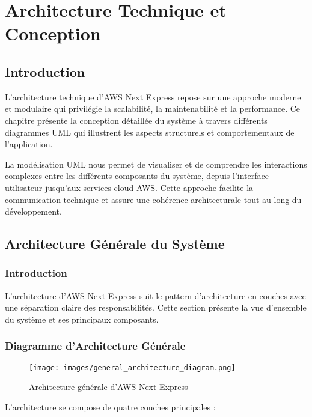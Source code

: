 \chapter{Architecture Technique et Conception}

\section{Introduction}

L'architecture technique d'AWS Next Express repose sur une approche moderne et modulaire qui privilégie la scalabilité, la maintenabilité et la performance. Ce chapitre présente la conception détaillée du système à travers différents diagrammes UML qui illustrent les aspects structurels et comportementaux de l'application.

La modélisation UML nous permet de visualiser et de comprendre les interactions complexes entre les différents composants du système, depuis l'interface utilisateur jusqu'aux services cloud AWS. Cette approche facilite la communication technique et assure une cohérence architecturale tout au long du développement.

\section{Architecture Générale du Système}

\subsection{Introduction}

L'architecture d'AWS Next Express suit le pattern d'architecture en couches avec une séparation claire des responsabilités. Cette section présente la vue d'ensemble du système et ses principaux composants.

\subsection{Diagramme d'Architecture Générale}

\begin{figure}[H]
    \centering
    \texttt{[image: images/general\_architecture\_diagram.png]}
    \caption{Architecture générale d'AWS Next Express}
    \label{fig:general_architecture}
\end{figure}

L'architecture se compose de quatre couches principales :

